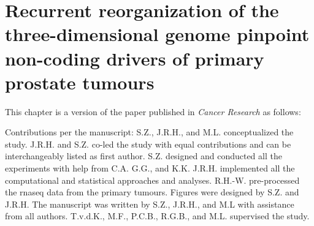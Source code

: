 \chapter{Recurrent reorganization of the three-dimensional genome pinpoint non-coding drivers of primary prostate tumours}
\label{chap:3D}

This chapter is a version of the paper published in \emph{Cancer Research} as follows:


\vspace{1em}

Contributions per the manuscript:
S.Z., J.R.H., and M.L. conceptualized the study.
J.R.H. and S.Z. co-led the study with equal contributions and can be interchangeably listed as first author.
S.Z. designed and conducted all the experiments with help from C.A. G.G., and K.K.
J.R.H. implemented all the computational and statistical approaches and analyses.
R.H.-W. pre-processed the \gls{rnaseq} data from the primary tumours.
Figures were designed by S.Z. and J.R.H.
The manuscript was written by S.Z., J.R.H., and M.L with assistance from all authors.
T.v.d.K., M.F., P.C.B., R.G.B., and M.L. supervised the study.






